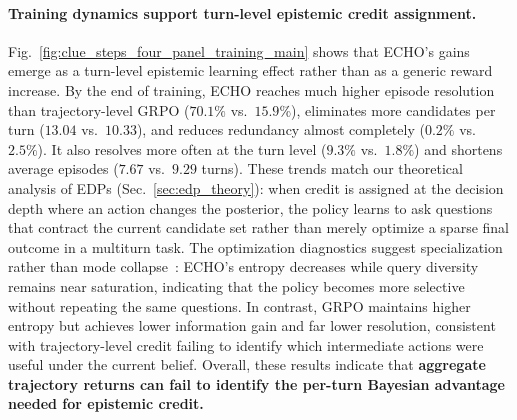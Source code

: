 \documentclass[11pt]{article}
\theoremstyle{plain}
\theoremstyle{definition}
\theoremstyle{remark}
\begin{document}
\paragraph{Training dynamics support turn-level epistemic credit assignment.}
Fig.~\ref{fig:clue_steps_four_panel_training_main} 
shows that \textsc{ECHO}'s gains emerge as a turn-level epistemic learning effect rather than as a generic reward increase. By the end of training, \textsc{ECHO} reaches much higher episode resolution than trajectory-level GRPO (\(70.1\%\) vs.\ \(15.9\%\)), eliminates more candidates per turn (\(13.04\) vs.\ \(10.33\)), and reduces redundancy almost completely (\(0.2\%\) vs.\ \(2.5\%\)). It also resolves more often at the turn level (\(9.3\%\) vs.\ \(1.8\%\)) and shortens average episodes (\(7.67\) vs.\ \(9.29\) turns). These trends match our theoretical analysis of EDPs (Sec.~\ref{sec:edp_theory}): when credit is assigned at the decision depth where an action changes the posterior, the policy learns to ask questions that contract the current candidate set rather than merely optimize a sparse final outcome in a multiturn task. The optimization diagnostics suggest specialization rather than mode collapse~\citep{janus2022mysteries,zhang2025verbalized}: \textsc{ECHO}'s entropy decreases while query diversity remains near saturation, indicating that
the policy becomes more selective without repeating the same questions. In contrast, GRPO maintains higher entropy but achieves lower information gain and far lower resolution, consistent with trajectory-level credit failing to identify which intermediate actions were useful under the current belief. Overall, these results indicate that \textbf{aggregate trajectory returns can
fail to identify the per-turn Bayesian advantage needed for epistemic credit.}

\vspace*{-3mm}
\end{document}
